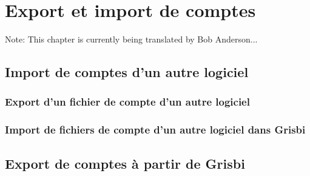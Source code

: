 

\chapter{Export et import de comptes\label{move}}

Note: This chapter is currently being translated by Bob Anderson...

\section{Import de comptes d'un autre logiciel\label{move-import}}


\subsection{Export d'un fichier de compte d'un autre logiciel\label{move-import-exportinit}}

\subsection{Import de fichiers de compte d'un autre logiciel dans Grisbi\label{move-import-importinit}}



\section{Export de comptes à partir de Grisbi\label{move-export}}













